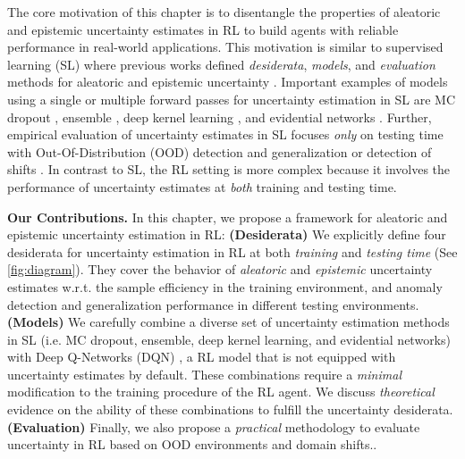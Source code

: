 The core motivation of this chapter is to disentangle the properties of aleatoric and epistemic uncertainty estimates in RL to build agents with reliable performance in real-world applications. This motivation is similar to supervised learning (SL) where previous works defined \emph{desiderata}, \emph{models}, and \emph{evaluation} methods for aleatoric and epistemic uncertainty \citep{uncertainty-deep-learning, review-uncertainty-dl, dataset-shift, robustness-uncertainty-dirichlet}. Important examples of models using a single or multiple forward passes for uncertainty estimation in SL are MC dropout \citep{dropout}, ensemble \citep{ensembles, hyper-ensembles, batch-ensembles}, deep kernel learning \citep{simple-baseline-uncertainty, due, duq, uceloss}, and evidential networks \citep{charpentier2020, PriorNetworks, natpn, evidential-regression}. Further, empirical evaluation of uncertainty estimates in SL focuses \emph{only} on testing time with Out-Of-Distribution (OOD) detection and generalization or detection of shifts \citep{dataset-shift, shifts-dataset}. In contrast to SL, the RL setting is more complex because it involves the performance of uncertainty estimates at \emph{both} training and testing time.

\textbf{Our Contributions.} In this chapter, we propose a framework for aleatoric and epistemic uncertainty estimation in RL: \textbf{(Desiderata)} We explicitly define four desiderata for uncertainty estimation in RL at both \emph{training} and \emph{testing time} (See \cref{fig:diagram}). They cover the behavior of \emph{aleatoric} and \emph{epistemic} uncertainty estimates w.r.t. the sample efficiency in the training environment, and anomaly detection and generalization performance in different testing environments. \textbf{(Models)} We carefully combine a diverse set of uncertainty estimation methods in SL (i.e. MC dropout, ensemble, deep kernel learning, and evidential networks) with Deep Q-Networks (DQN) \citep{dqn}, a RL model that is not equipped with uncertainty estimates by default. These combinations require a \emph{minimal} modification to the training procedure of the RL agent. We discuss \emph{theoretical} evidence on the ability of these combinations to fulfill the uncertainty desiderata. \textbf{(Evaluation)} Finally, we also propose a \emph{practical} methodology to evaluate uncertainty in RL based on OOD environments and domain shifts..
